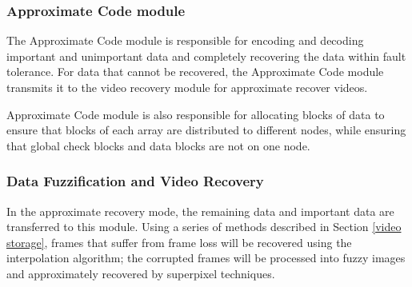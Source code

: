 \documentclass[sigconf]{acmart}
\begin{document}
\subsubsection{Approximate Code module}
The Approximate Code module is responsible for encoding and decoding important and unimportant data and completely recovering the data within fault tolerance. For data that cannot be recovered, the Approximate Code module transmits it to the video recovery module for approximate recover videos.

Approximate Code module is also responsible for allocating blocks of data to ensure that blocks of each array are distributed to different nodes, while ensuring that global check blocks and data blocks are not on one node.

\subsubsection{Data Fuzzification and Video Recovery}
In the approximate recovery mode, the remaining data and important data are transferred to this module. Using a series of methods described in Section \ref{video storage}, frames that suffer from frame loss will be recovered using the interpolation algorithm; the corrupted frames will be processed into fuzzy images and approximately recovered by superpixel techniques.

\iffalse
\end{document}
